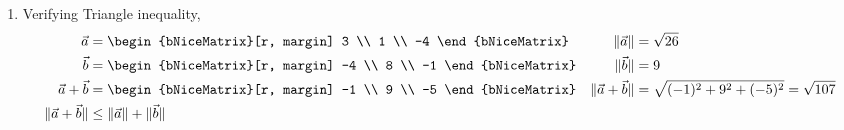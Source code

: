 \begin{enumerate}
    \item Verifying Triangle inequality,
          \begin{align}
              \vec{a}                         & = \begin{bNiceMatrix}[r, margin]
                                                      3 \\ 1 \\ -4
                                                  \end{bNiceMatrix} &
              \lVert \vec{a} \rVert           & = \sqrt{26}                      \\
              \vec{b}                         & = \begin{bNiceMatrix}[r, margin]
                                                      -4 \\ 8 \\ -1
                                                  \end{bNiceMatrix} &
              \lVert \vec{b} \rVert           & = 9                              \\
              \vec{a} + \vec{b}               & = \begin{bNiceMatrix}[r, margin]
                                                      -1 \\ 9 \\ -5
                                                  \end{bNiceMatrix} &
              \lVert \vec{a} + \vec{b} \rVert & = \sqrt{(-1)^2 + 9^2 + (-5)^2} =
              \sqrt{107}                                                         \\
              \lVert \vec{a} + \vec{b} \rVert & \leq \lVert \vec{a} \rVert
              + \lVert \vec{b} \rVert
          \end{align}


\end{enumerate}
